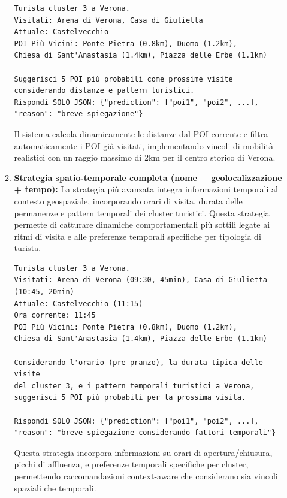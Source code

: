 \begin{itemize}
\begin{enumerate}
\begin{lstlisting}[language=text, caption=Esempio di Prompt Geospaziale]
Turista cluster 3 a Verona.
Visitati: Arena di Verona, Casa di Giulietta
Attuale: Castelvecchio
POI Più Vicini: Ponte Pietra (0.8km), Duomo (1.2km), 
Chiesa di Sant'Anastasia (1.4km), Piazza delle Erbe (1.1km)

Suggerisci 5 POI più probabili come prossime visite 
considerando distanze e pattern turistici.
Rispondi SOLO JSON: {"prediction": ["poi1", "poi2", ...], 
"reason": "breve spiegazione"}
\end{lstlisting}

Il sistema calcola dinamicamente le distanze dal POI corrente e filtra automaticamente i POI già visitati, implementando vincoli di mobilità realistici con un raggio massimo di 2km per il centro storico di Verona.

\item \textbf{Strategia spatio-temporale completa (nome + geolocalizzazione + tempo):} La strategia più avanzata integra informazioni temporali al contesto geospaziale, incorporando orari di visita, durata delle permanenze e pattern temporali dei cluster turistici. Questa strategia permette di catturare dinamiche comportamentali più sottili legate ai ritmi di visita e alle preferenze temporali specifiche per tipologia di turista.

\begin{lstlisting}[language=text, caption=Esempio di Prompt Spatio-temporale]
Turista cluster 3 a Verona.
Visitati: Arena di Verona (09:30, 45min), Casa di Giulietta (10:45, 20min)
Attuale: Castelvecchio (11:15)
Ora corrente: 11:45
POI Più Vicini: Ponte Pietra (0.8km), Duomo (1.2km), 
Chiesa di Sant'Anastasia (1.4km), Piazza delle Erbe (1.1km)

Considerando l'orario (pre-pranzo), la durata tipica delle visite 
del cluster 3, e i pattern temporali turistici a Verona, 
suggerisci 5 POI più probabili per la prossima visita.

Rispondi SOLO JSON: {"prediction": ["poi1", "poi2", ...], 
"reason": "breve spiegazione considerando fattori temporali"}
\end{lstlisting}

Questa strategia incorpora informazioni su orari di apertura/chiusura, picchi di affluenza, e preferenze temporali specifiche per cluster, permettendo raccomandazioni context-aware che considerano sia vincoli spaziali che temporali.

\end{enumerate}


\end{itemize}
